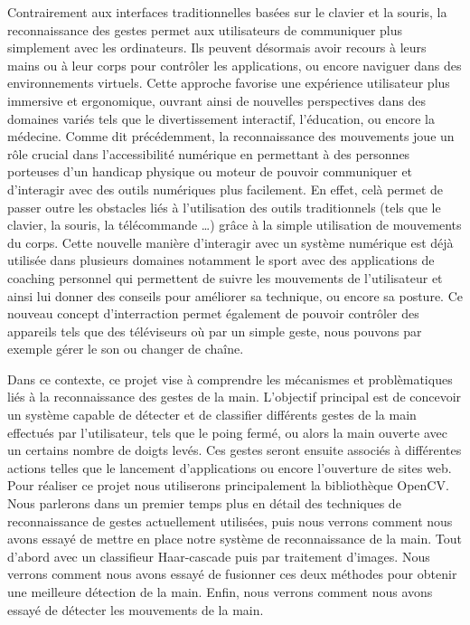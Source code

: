 \documentclass[11pt]{article}
\begin{document}
Contrairement aux interfaces traditionnelles basées sur le clavier et la souris, la reconnaissance des gestes permet aux utilisateurs de communiquer plus simplement avec les ordinateurs. Ils peuvent désormais avoir recours à leurs mains ou à leur corps pour contrôler les applications, ou encore naviguer dans des environnements virtuels. Cette approche favorise une expérience utilisateur plus immersive et ergonomique, ouvrant ainsi de nouvelles perspectives dans des domaines variés tels que le divertissement interactif, l'éducation, ou encore la médecine. Comme dit précédemment, la reconnaissance des mouvements joue un rôle crucial dans l’accessibilité numérique en permettant à des personnes porteuses d'un handicap physique  ou moteur de pouvoir communiquer et d'interagir avec des outils numériques plus facilement. En effet, celà permet de passer outre les obstacles liés à l’utilisation des outils traditionnels (tels que le clavier, la souris, la télécommande …) grâce à la simple utilisation de mouvements du corps. Cette nouvelle manière d'interagir avec un système numérique est déjà utilisée dans plusieurs domaines notamment le sport avec des applications de coaching personnel qui permettent de suivre les mouvements de l'utilisateur et ainsi lui donner des conseils pour améliorer sa technique, ou encore sa posture. Ce nouveau concept d'interraction permet également de pouvoir contrôler des appareils tels que des téléviseurs où par un simple geste, nous pouvons par exemple gérer le son ou changer de chaîne. \bigbreak

Dans ce contexte, ce projet vise à comprendre les mécanismes et problèmatiques liés à la reconnaissance des gestes de la main.
L'objectif principal est de concevoir un système capable de détecter et de classifier différents gestes de la main effectués par l'utilisateur,
tels que le poing fermé, ou alors la main ouverte avec un certains nombre de doigts levés. Ces gestes seront ensuite associés à différentes
actions telles que le lancement d'applications ou encore l'ouverture de sites web.
Pour réaliser ce projet nous utiliserons principalement la bibliothèque OpenCV. Nous parlerons dans un premier temps plus en détail des techniques de reconnaissance de gestes actuellement utilisées, puis nous verrons comment nous avons essayé de mettre en place notre système de reconnaissance de la main. Tout d'abord avec un classifieur Haar-cascade puis par traitement d'images. Nous verrons comment nous avons essayé de fusionner ces deux méthodes pour obtenir une meilleure détection de la main. Enfin, nous verrons comment nous avons essayé de détecter les mouvements de la main. \bigbreak
\end{document}

